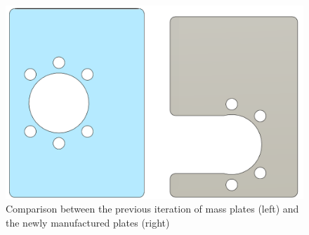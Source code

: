 \begin{figure}[h]
    \centering
    \includegraphics[width=0.8\linewidth]{figures/plate_comparison.png}
    \caption{Comparison between the previous iteration of mass plates (left) and the newly manufactured plates (right)}
    \label{fig:plate_comparison}
\end{figure}

